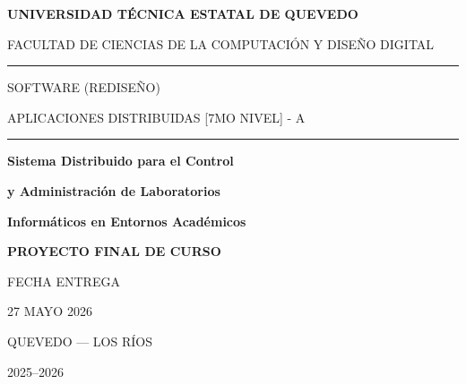 \documentclass[12pt,a4paper]{article}
\begin{document}
\begin{titlepage}

\thispagestyle{empty}


\begin{center}

\vspace*{1.3cm}

{\Large\bfseries
UNIVERSIDAD TÉCNICA ESTATAL DE QUEVEDO
}

\vspace{0.3cm}

{\large
FACULTAD DE CIENCIAS DE LA COMPUTACIÓN Y DISEÑO DIGITAL
}

\vspace{1cm}

\rule{11cm}{0.5pt}

\vspace{0.5cm}

SOFTWARE (REDISEÑO)

\vspace{0.3cm}

APLICACIONES DISTRIBUIDAS [7MO NIVEL] - A

\vspace{0.5cm}

\rule{11cm}{0.5pt}

\vspace{2cm}

{\Huge\bfseries
Sistema Distribuido para el Control
}

\vspace{0.2cm}

{\Huge\bfseries
y Administración de Laboratorios
}

\vspace{0.2cm}

{\Huge\bfseries
Informáticos en Entornos Académicos
}

\vspace{2cm}

\begin{tcolorbox}[width=10cm]

\centering
\Large
\textbf{PROYECTO FINAL DE CURSO}

\end{tcolorbox}

\vfill

FECHA ENTREGA

27 MAYO 2026

\vspace{0.7cm}

QUEVEDO — LOS RÍOS

2025–2026

\end{center}

\end{titlepage}
\end{document}

